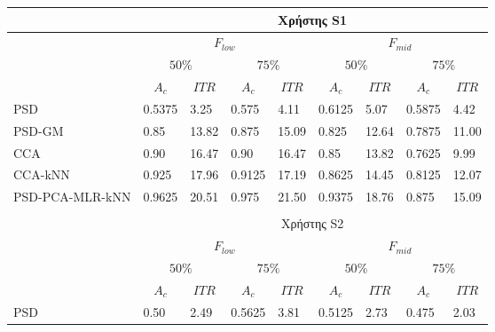 \documentclass[11pt,a4paper,english,greek,twoside]{../Thesis}
\begin{document}
\begin{table}[H]
    \centering
    \begin{tabular}{ |p{4cm}||p{1cm}|p{1cm}|p{1cm}|p{1cm}|p{1cm}|p{1cm}|p{1cm}|p{1cm}|}
        \hline
        \multicolumn{1}{|c||}{}& \multicolumn{8}{c|}{Χρήστης S1}\\
        \hline
        & \multicolumn{4}{c|}{$F_{low}$} & \multicolumn{4}{c|}{$F_{mid}$} \\
        \hline
        & \multicolumn{2}{c|}{$50\%$} & \multicolumn{2}{c|}{$75\%$} &
        \multicolumn{2}{c|}{$50\%$} & \multicolumn{2}{c|}{$75\%$} \\
        \hline
        & \multicolumn{1}{c|}{$A_c$} & \multicolumn{1}{c|}{$ITR$} &
         \multicolumn{1}{c|}{$A_c$} & \multicolumn{1}{c|}{$ITR$} &
          \multicolumn{1}{c|}{$A_c$} & \multicolumn{1}{c|}{$ITR$} &
           \multicolumn{1}{c|}{$A_c$} & \multicolumn{1}{c|}{$ITR$} \\
        \hline
        PSD             & 0.5375& 3.25& 0.575& 4.11& 0.6125& 5.07& 0.5875& 4.42 \\
        PSD-GM          & 0.85& 13.82& 0.875& 15.09& 0.825& 12.64& 0.7875&  11.00 \\
        CCA             & 0.90& 16.47& 0.90& 16.47& 0.85& 13.82& 0.7625& 9.99 \\
        CCA-kNN         & 0.925& 17.96& 0.9125& 17.19& 0.8625& 14.45& 0.8125&  12.07 \\
        PSD-PCA-MLR-kNN & 0.9625& 20.51& 0.975& 21.50& 0.9375& 18.76& 0.875& 15.09  \\
        \hline
        \multicolumn{5}{c}{}\\
        \hline
        \multicolumn{1}{|c||}{}& \multicolumn{8}{c|}{Χρήστης S2}\\
        \hline
        & \multicolumn{4}{c|}{$F_{low}$} & \multicolumn{4}{c|}{$F_{mid}$} \\
        \hline
        & \multicolumn{2}{c|}{$50\%$} & \multicolumn{2}{c|}{$75\%$} &
        \multicolumn{2}{c|}{$50\%$} & \multicolumn{2}{c|}{$75\%$} \\
        \hline
        & \multicolumn{1}{c|}{$A_c$} & \multicolumn{1}{c|}{$ITR$} &
         \multicolumn{1}{c|}{$A_c$} & \multicolumn{1}{c|}{$ITR$} &
          \multicolumn{1}{c|}{$A_c$} & \multicolumn{1}{c|}{$ITR$} &
           \multicolumn{1}{c|}{$A_c$} & \multicolumn{1}{c|}{$ITR$} \\
        \hline
        PSD             & 0.50& 2.49& 0.5625& 3.81& 0.5125& 2.73& 0.475& 2.03 \\

\end{tabular}
\end{table}
\end{document}
